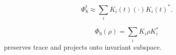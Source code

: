 \begin{lemma}
\[
\Phi_8^t \approx \sum_i K_i(t) (\cdot) K_i(t)^\ast.
\]
\end{lemma}

\begin{lemma}
\[
\Phi_9(\rho) = \sum_i K_i \rho K_i^\ast
\]
preserves trace and projects onto invariant subspace.
\end{lemma}

